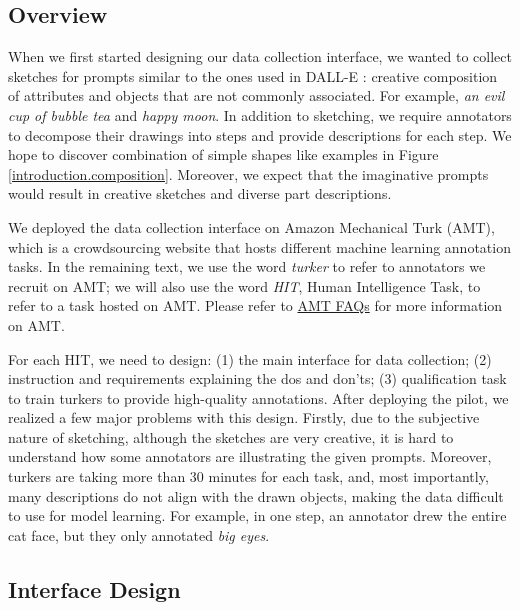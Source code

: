 \subsection{Overview}
When we first started designing our data collection interface, we wanted to collect sketches for prompts similar to the ones used in DALL-E \citep{dallePaper}: creative composition of attributes and objects that are not commonly associated. 
For example, \textit{an evil cup of bubble tea} and \textit{happy moon}. 
In addition to sketching, we require annotators to decompose their drawings into steps and provide descriptions for each step. We hope to discover combination of simple shapes like examples in Figure \ref{introduction.composition}. Moreover, we expect that the imaginative prompts would result in creative sketches and diverse part descriptions.   

We deployed the data collection interface on Amazon Mechanical Turk (AMT), which is a crowdsourcing website that hosts different machine learning annotation tasks. In the remaining text, we use the word \textit{turker} to refer to annotators we recruit on AMT; we will also use the word \textit{HIT}, Human Intelligence Task, to refer to a task hosted on AMT. Please refer to \href{https://www.mturk.com/worker/help#:~:text=A%20Human%20Intelligence%20Task%2C%20or,be%20completed%20by%20Worker%20customers.}{AMT FAQs} for more information on AMT. 
 
For each HIT, we need to design: (1) the main interface for data collection; (2) instruction and requirements explaining the dos and don'ts; (3) qualification task to train turkers to provide high-quality annotations. 
After deploying the pilot, we realized a few major problems with this design. Firstly, due to the subjective nature of sketching, although the sketches are very creative, it is hard to understand how some annotators are illustrating the given prompts. Moreover, turkers are taking more than 30 minutes for each task, and, most importantly, many descriptions do not align with the drawn objects, making the data difficult to use for model learning. For example, in one step, an annotator drew the entire cat face, but they only annotated \textit{big eyes}.      

\subsection{Interface Design}

